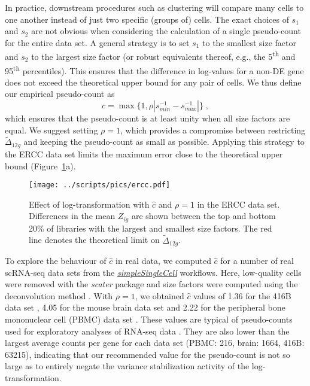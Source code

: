 \documentclass[10pt,letterpaper]{article}
\begin{document}
In practice, downstream procedures such as clustering will compare many cells to one another instead of just two specific (groups of) cells.
The exact choices of $s_1$ and $s_2$ are not obvious when considering the calculation of a single pseudo-count for the entire data set.
A general strategy is to set $s_1$ to the smallest size factor and $s_2$ to the largest size factor
(or robust equivalents thereof, e.g., the 5\textsuperscript{th} and 95\textsuperscript{th} percentiles).
This ensures that the difference in log-values for a non-DE gene does not exceed the theoretical upper bound for any pair of cells.
We thus define our empirical pseudo-count as
\[
\hat c = \max\{1, \rho |s_{min}^{-1} - s_{max}^{-1}|\} \;,
\]
which ensures that the pseudo-count is at least unity when all size factors are equal.
We suggest setting $\rho=1$, which provides a compromise between restricting $\tilde\Delta_{12g}$ and keeping the pseudo-count as small as possible.
Applying this strategy to the ERCC data set limits the maximum error close to the theoretical upper bound (Figure~\ref{fig:bigreal}a).

\begin{figure}
\begin{center}
    \texttt{[image: ../scripts/pics/ercc.pdf]}
\end{center}
\caption{Effect of log-transformation with $\hat c$ and $\rho =1$ in the ERCC data set.
Differences in the mean $Z_{ig}$ are shown between the top and bottom 20\% of libraries with the largest and smallest size factors.
The red line denotes the theoretical limit on $\tilde \Delta_{12g}$.}
\label{fig:bigreal}
\end{figure}

To explore the behaviour of $\hat c$ in real data, we computed $\hat c$ for a number of real scRNA-seq data sets from the \href{http://bioconductor.org/packages/devel/workflows/html/simpleSingleCell.html}{\emph{simpleSingleCell}} workflows.
Here, low-quality cells were removed with the \emph{scater} package \cite{mccarthy2017scater} and size factors were computed using the deconvolution method \cite{lun2016pooling}.
With $\rho=1$, we obtained $\hat c$ values of 1.36 for the 416B data set \cite{lun2017assessing}, 4.05 for the mouse brain data set \cite{zeisel2015brain} and 2.22 for the peripheral bone mononuclear cell (PBMC) data set \cite{zheng2017massively}.
These values are typical of pseudo-counts used for exploratory analyses of RNA-seq data \cite{chen2016reads}.
They are also lower than the largest average counts per gene for each data set (PBMC: 216, brain: 1664, 416B: 63215),
indicating that our recommended value for the pseudo-count is not so large as to entirely negate the variance stabilization activity of the log-transformation.     
\end{document}
